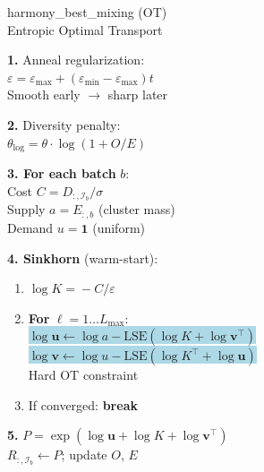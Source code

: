\documentclass[8pt]{article}
\newlength{\colw}
\begin{document}
\begin{minipage}[t]{\colw}
\begin{tcolorbox}[colback=hdrC, colframe=hdrC, fontupper=\bfseries\footnotesize\color{white},
    arc=2pt, left=2pt, right=2pt, top=1pt, bottom=1pt]
\centering harmony\_best\_mixing (OT)\\[-2pt]
{\scriptsize\mdseries Entropic Optimal Transport}
\end{tcolorbox}
\vspace{1pt}

\begin{keyboxB}
\textbf{1.} Anneal regularization:\\
$\varepsilon\!=\!\varepsilon_\text{max}+(\varepsilon_\text{min}\!-\!\varepsilon_\text{max})t$\\
{\scriptsize Smooth early $\to$ sharp later}
\end{keyboxB}\vspace{1pt}

\begin{stepbox}
\textbf{2.} Diversity penalty:\\
$\theta_\text{log}\!=\!\theta\!\cdot\!\log(1+O/E)$
\end{stepbox}\vspace{1pt}

\begin{keyboxB}
\textbf{3. For each batch} $b$:\\
Cost $C\!=\!D_{:,\mathcal{I}_b}/\sigma$\\
Supply $a\!=\!E_{:,b}$ {\scriptsize (cluster mass)}\\
Demand $u\!=\!\mathbf{1}$ {\scriptsize (uniform)}
\end{keyboxB}\vspace{1pt}

\begin{keyboxB}
\textbf{4. Sinkhorn} (warm-start):
\begin{enumerate}[leftmargin=1em, itemsep=0pt, topsep=1pt, parsep=0pt]
\item $\log K\!=\!-C/\varepsilon$
\item \textbf{For} $\ell=1\ldots L_\text{max}$:\\
    \colorbox{lightblue}{\scriptsize $\log\mathbf{u}\!\gets\!\log a - \text{LSE}(\log K\!+\!\log\mathbf{v}^\top)$}\\
    \colorbox{lightblue}{\scriptsize $\log\mathbf{v}\!\gets\!\log u - \text{LSE}(\log K^\top\!\!+\!\log\mathbf{u})$}\\
    {\scriptsize\color{keychange} Hard OT constraint}
\item If converged: \textbf{break}
\end{enumerate}
\end{keyboxB}\vspace{1pt}

\begin{stepbox}
\textbf{5.} $P\!=\!\exp(\log\mathbf{u}\!+\!\log K\!+\!\log\mathbf{v}^\top)$\\
$R_{:,\mathcal{I}_b}\!\gets\!P$; update $O$, $E$
\end{stepbox}
\end{minipage}
\end{document}
